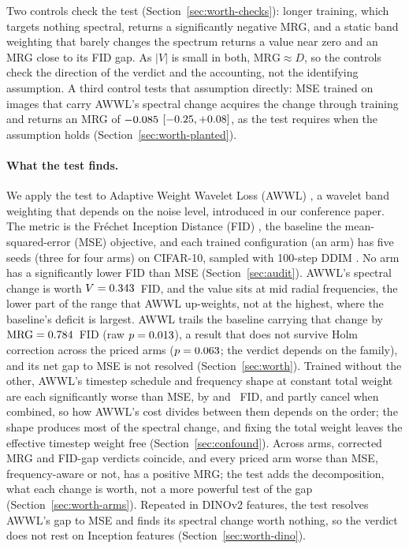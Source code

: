 Two controls check the test (Section~\ref{sec:worth-checks}): longer
training, which targets nothing spectral, returns a significantly negative
MRG, and a static band weighting that barely changes the spectrum returns a
value near zero and an MRG close to its FID gap. As $|V|$ is small in both,
$\mathrm{MRG} \approx D$, so the controls check the direction of the verdict
and the accounting, not the identifying assumption. A third control tests
that assumption directly: MSE trained on images that carry AWWL's spectral
change acquires the change through training and returns an MRG of
$-0.085$ $[-0.25, +0.08]$, as the test requires when the
assumption holds (Section~\ref{sec:worth-planted}).

\paragraph{What the test finds.}
We apply the test to Adaptive Weight Wavelet Loss (AWWL)
\citep{thao2026awwl}, a wavelet band weighting that depends on the noise
level, introduced in our conference paper. The metric is the Fr\'echet Inception
Distance (FID) \citep{heusel2017gans}, the baseline the mean-squared-error
(MSE) objective, and each trained configuration (an arm) has five seeds
(three for four arms) on CIFAR-10, sampled with 100-step DDIM
\citep{song2021denoising}. No arm has a significantly lower FID than MSE
(Section~\ref{sec:audit}). AWWL's spectral change is worth
$V = 0.343$~FID, and the value sits at mid radial
frequencies, the lower part of the range that AWWL up-weights, not at the
highest, where the baseline's deficit is largest. AWWL trails the baseline
carrying that change by $\mathrm{MRG} = 0.784$~FID (raw $p = 0.013$),
a result that does not survive Holm correction across the \nFamilyPricing{}
priced arms ($p = 0.063$; the verdict depends on the family), and its net gap to MSE is not resolved
(Section~\ref{sec:worth}).
Trained without the other, AWWL's timestep schedule and frequency shape at
constant total weight are each significantly worse than MSE, by
\dTimestep{} and \dSumFixed~FID, and partly cancel when combined, so how
AWWL's cost divides between them depends on the order; the shape produces
most of the spectral change, and fixing the total weight leaves the
effective timestep weight free (Section~\ref{sec:confound}). Across arms,
corrected MRG and FID-gap verdicts coincide, and every priced arm worse than
MSE, frequency-aware or not, has a positive MRG; the test adds the
decomposition, what each change is worth, not a more powerful test of the
gap (Section~\ref{sec:worth-arms}). Repeated in DINOv2 features, the test
resolves AWWL's gap to MSE and finds its spectral change worth nothing, so the
verdict does not rest on Inception features (Section~\ref{sec:worth-dino}).

